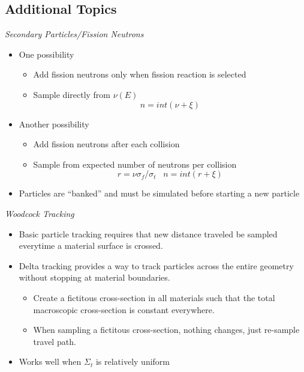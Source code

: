 \subsection{Additional Topics}

\emph{Secondary Particles/Fission Neutrons}
  \begin{itemize}
   \item One possibility
   \begin{itemize}
    \item Add fission neutrons only when fission reaction is selected
    \item Sample directly from $\nu(E)$
    \begin{equation*}
       n = int(\nu+\xi)
    \end{equation*}
   \end{itemize}
   
   \item Another possibility
     \begin{itemize}
        \item Add fission neutrons after each collision
        \item Sample from expected number of neutrons per collision
        \begin{equation*}
           r = \nu \sigma_{f}/\sigma_{t} \; \; \; n = int(r+\xi)
        \end{equation*}
     \end{itemize}
    
    \item Particles are ``banked'' and must be simulated before starting a new particle
  \end{itemize}


\emph{Woodcock Tracking}
  \begin{itemize}
   \item Basic particle tracking requires that new distance traveled be sampled everytime a material surface is crossed.
   \item Delta tracking provides a way to track particles across the entire geometry without stopping at material boundaries.
   \begin{itemize}
    \item Create a fictitous cross-section in all materials such that the total macroscopic cross-section is constant everywhere.
    \item When sampling a fictitous cross-section, nothing changes, just re-sample travel path.
   \end{itemize}
   \item Works well when $\Sigma_t$ is relatively uniform
  \end{itemize}


